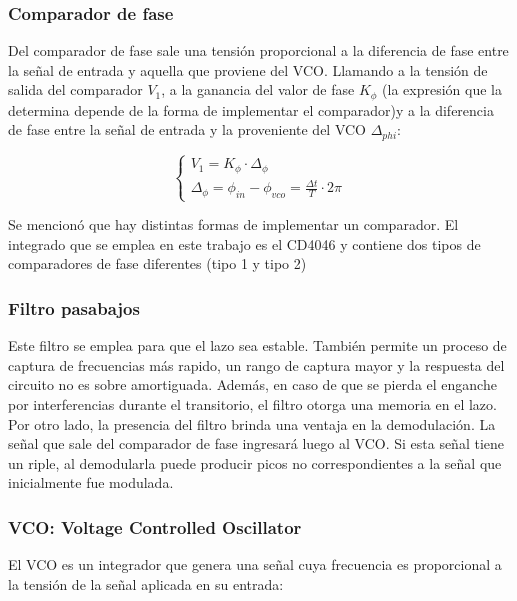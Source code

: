 	\subsubsection{Comparador de fase}
	Del comparador de fase sale una tensi\'on proporcional a la diferencia de fase entre la se\~nal de entrada y aquella que proviene del VCO. Llamando a la tensi\'on de salida del comparador $V_1$, a la ganancia del valor de fase $K_{\phi}$ (la expresi\'on que la determina depende de la forma de implementar el comparador)y a la diferencia de fase entre la se\~nal de entrada y la proveniente del VCO $\Delta_{phi}$:
	
	\begin{equation}
		\begin{cases}
			V_1 = K_{\phi} \cdot \Delta_{\phi} \\
			\Delta_{\phi} = \phi_{in} - \phi_{vco} = \frac{\Delta t}{T}\cdot 2 \pi 	
		\end{cases}
	\end{equation}
	
	Se mencion\'o que hay distintas formas de implementar un comparador. El integrado que se emplea en este trabajo es el CD4046 y contiene dos tipos de comparadores de fase diferentes (tipo 1 y tipo 2) 
	
	\subsubsection{Filtro pasabajos}
	Este filtro se emplea para que el lazo sea estable. Tambi\'en permite un proceso de captura de frecuencias m\'as rapido, un rango de captura mayor y la respuesta del circuito no es sobre amortiguada. Adem\'as, en caso de que se pierda el enganche por interferencias durante el transitorio, el filtro otorga una memoria en el lazo. Por otro lado, la presencia del filtro brinda una ventaja en la demodulaci\'on. La señal que sale del comparador de fase ingresar\'a luego al VCO. Si esta señal tiene un riple, al demodularla puede producir picos no correspondientes a la señal que inicialmente fue modulada.
		
	\subsubsection{VCO: Voltage Controlled Oscillator}
	El VCO es un integrador que genera una señal cuya frecuencia es proporcional a la tensi\'on de la señal aplicada en su entrada:
	
